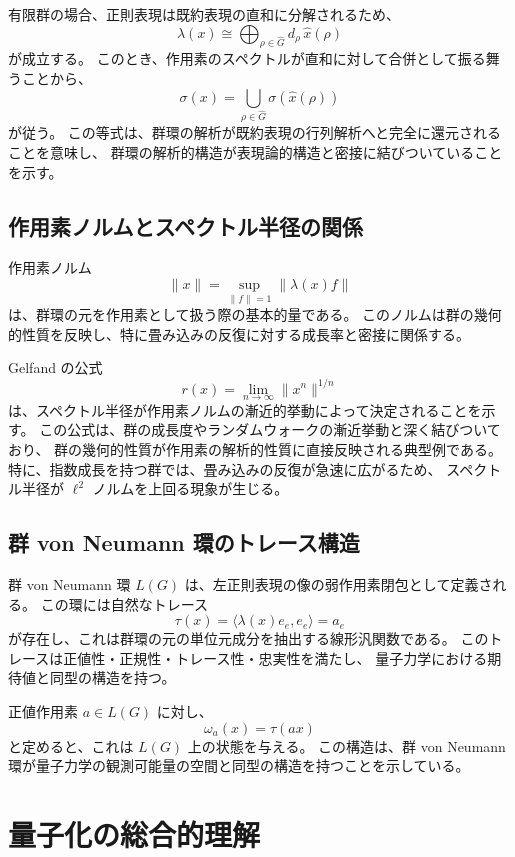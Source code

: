 \documentclass[12pt,a4paper]{ltjarticle}
\theoremstyle{definition}
\begin{document}
有限群の場合、正則表現は既約表現の直和に分解されるため、
\[
\lambda(x)\cong\bigoplus_{\rho\in\widehat{G}} d_\rho\,\widehat{x}(\rho)
\]
が成立する。
このとき、作用素のスペクトルが直和に対して合併として振る舞うことから、
\[
\sigma(x)=\bigcup_{\rho\in\widehat{G}}\sigma(\widehat{x}(\rho))
\]
が従う。
この等式は、群環の解析が既約表現の行列解析へと完全に還元されることを意味し、
群環の解析的構造が表現論的構造と密接に結びついていることを示す。

\subsection{作用素ノルムとスペクトル半径の関係}

作用素ノルム
\[
\|x\|=\sup_{\|f\|=1}\|\lambda(x)f\|
\]
は、群環の元を作用素として扱う際の基本的量である。
このノルムは群の幾何的性質を反映し、特に畳み込みの反復に対する成長率と密接に関係する。

Gelfand の公式
\[
r(x)=\lim_{n\to\infty}\|x^n\|^{1/n}
\]
は、スペクトル半径が作用素ノルムの漸近的挙動によって決定されることを示す。
この公式は、群の成長度やランダムウォークの漸近挙動と深く結びついており、
群の幾何的性質が作用素の解析的性質に直接反映される典型例である。
特に、指数成長を持つ群では、畳み込みの反復が急速に広がるため、
スペクトル半径が $\ell^2$ ノルムを上回る現象が生じる。

\subsection{群 von Neumann 環のトレース構造}

群 von Neumann 環 $L(G)$ は、左正則表現の像の弱作用素閉包として定義される。
この環には自然なトレース
\[
\tau(x)=\langle \lambda(x)e_e,e_e\rangle=a_e
\]
が存在し、これは群環の元の単位元成分を抽出する線形汎関数である。
このトレースは正値性・正規性・トレース性・忠実性を満たし、
量子力学における期待値と同型の構造を持つ。

正値作用素 $a\in L(G)$ に対し、
\[
\omega_a(x)=\tau(ax)
\]
と定めると、これは $L(G)$ 上の状態を与える。
この構造は、群 von Neumann 環が量子力学の観測可能量の空間と同型の構造を持つことを示している。

\section{量子化の総合的理解}
\end{document}
